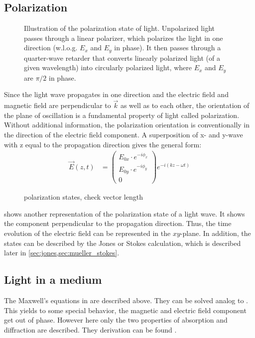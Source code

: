 \subsection{Polarization}
% 
\begin{figure}[!t]
\centering
\setlength{\tikzwidth}{\textwidth}
\label{fig:polarization_state}
\caption{Illustration of the polarization state of light. Unpolarized light passes through a linear polarizer, which polarizes the light in one direction (w.l.o.g. $E_x$ and $E_y$ in phase). It then passes through a quarter-wave retarder that converts linearly polarized light (of a given wavelength) into circularly polarized light, where $E_x$ and $E_y$ are $\pi/2$ in phase.}
\end{figure}
% 
Since the light wave propagates in one direction and the electric field and magnetic field are perpendicular to $\vec{k}$ as well as to each other, the orientation of the plane of oscillation is a fundamental property of light called polarization.
Without additional information, the polarization orientation is conventionally in the direction of the electric field component.
% 
A superposition of x- and y-wave with z equal to the propagation direction gives the general form:
\begin{align}
\vec{E}(z,t) &= \begin{pmatrix} E_{0x} \cdot e^{ -i \phi_x } \\ E_{0y} \cdot e^{ -i \phi_y } \\ 0 \end{pmatrix}
e^{ -i (kz - \omega t)}
\end{align}
%
\begin{figure}[!t]
\centering
\tikzset{external/export=false}

\caption{polarization states, check vector length} 
\label{fig:polarization_state_vectors}
\end{figure}
%
 shows another representation of the polarization state of a light wave.
It shows the component perpendicular to the propagation direction.
Thus, the time evolution of the electric field can be represented in the $xy$-plane.
In addition, the states can be described by the Jones or Stokes calculation, which is described later in \cref{sec:jones,sec:mueller_stokes}.
% 
% 
% 
\subsection{Light in a medium}
% 
The Maxwell's equations in \dummy{} are described above. They can be solved analog to \dummy{}. This yields to some special behavior, \eg{} the magnetic and electric field component get out of phase.
However here only the two properties of absorption and diffraction are described.
They derivation can be found \eg{} \cite{demtroeder2, Fliebach2012}.
% 
